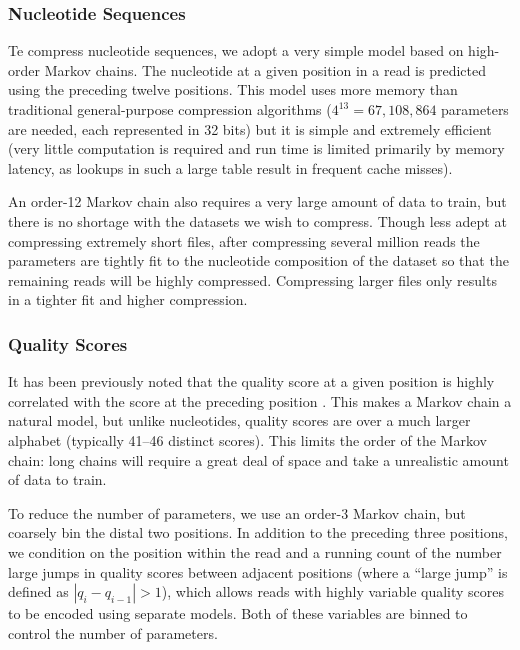 \documentclass[a4,center,fleqn]{NAR}
\begin{document}
\subsubsection{Nucleotide Sequences}

Te compress nucleotide sequences, we adopt a very simple model based on high-order
Markov chains. The nucleotide at a given position in a read is predicted
using the preceding twelve positions. This model uses more memory than
traditional general-purpose compression algorithms ($4^{13} = 67,108,864$
parameters are needed, each represented in 32 bits)  but it is simple and
extremely efficient (very little computation is required and run time is
limited primarily by memory latency, as lookups in such a large table result
in frequent cache misses).

An order-12 Markov chain also requires a very large amount of
data to train, but there is no shortage with the datasets we wish to
compress. Though less adept at compressing extremely short files,
after compressing several million reads the parameters are tightly
fit to the nucleotide composition of the dataset so that the remaining reads
will be highly compressed. Compressing larger files only results in a tighter
fit and higher compression.


\subsubsection{Quality Scores}

It has been previously noted that the quality score at a given position is
highly correlated with the score at the preceding position
\citep{Kozanitis2011}. This makes a Markov chain a natural model, but unlike
nucleotides, quality scores are over a much larger alphabet (typically 41--46
distinct scores). This limits the order of the Markov chain: long chains will
require a great deal of space and take a unrealistic amount of data to train.

To reduce the number of parameters, we use an order-3 Markov chain, but
coarsely bin the distal two positions. In addition to the preceding three
positions, we condition on the position within the read and a running count of
the number large jumps in quality scores between adjacent positions (where
a ``large jump'' is defined as $|q_{i} - q_{i-1}| > 1$), which allows reads
with highly variable quality scores to be encoded using separate models. Both
of these variables are binned to control the number of parameters.
\end{document}
